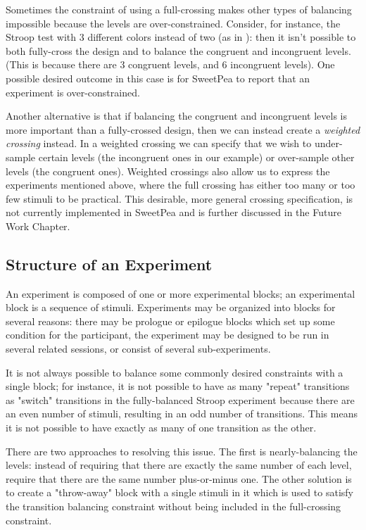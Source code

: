 Sometimes the constraint of using a full-crossing makes other types of balancing impossible because the levels are over-constrained. Consider, for instance, the Stroop test with 3 different colors instead of two (as in ): then it isn't possible to both fully-cross the design and to balance the congruent and incongruent levels. (This is because there are 3 congruent levels, and 6 incongruent levels). One possible desired outcome in this case is for SweetPea to report that an experiment is over-constrained.

Another alternative is that if balancing the congruent and incongruent levels is more important than a fully-crossed design, then we can instead create a \emph{weighted crossing} instead. In a weighted crossing we can specify that we wish to under-sample certain levels (the incongruent ones in our example) or over-sample other levels (the congruent ones). Weighted crossings also allow us to express the experiments mentioned above, where the full crossing has either too many or too few stimuli to be practical. This desirable, more general crossing specification, is not currently implemented in SweetPea and is further discussed in the Future Work Chapter.

\subsection{Structure of an Experiment}

An experiment is composed of one or more experimental blocks; an experimental block is a sequence of stimuli. Experiments may be organized into blocks for several reasons: there may be prologue or epilogue blocks which set up some condition for the participant, the experiment may be designed to be run in several related sessions, or consist of several sub-experiments.

It is not always possible to balance some commonly desired constraints with a single block; for instance, it is not possible to have as many "repeat" transitions as "switch" transitions in the fully-balanced Stroop experiment because there are an even number of stimuli, resulting in an odd number of transitions. This means it is not possible to have exactly as many of one transition as the other.

There are two approaches to resolving this issue. The first is nearly-balancing the levels: instead of requiring that there are exactly the same number of each level, require that there are the same number plus-or-minus one. The other solution is to create a "throw-away" block with a single stimuli in it which is used to satisfy the transition balancing constraint without being included in the full-crossing constraint.

